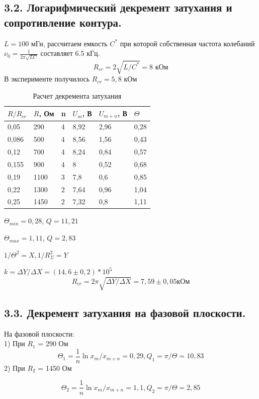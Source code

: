 \documentclass[a4paper,12pt]{article}
\begin{document}
\subsection*{3.2. Логарифмический декремент затухания и сопротивление контура.}

$L = 100$ мГн, рассчитаем емкость $C^*$ при которой собственная частота колебаний\\ $\nu_0 = \frac{1}{2\pi\sqrt{LC}}$ составляет 6.5 кГц.
$$
R_{cr} = 2\sqrt{L/C^*} = 8 \text{ кОм}
$$
В эксперименте получилось $R_{cr} = 5,8$ кОм
\newpage
\begin{table}[!ht]
    \centering
    \begin{tabular}{|l|l|l|l|l|l|}
    \hline
        $R/R_{cr}$ & $R$, Ом & n & $U_{m}$, В & $U_{m+n}$, В & $\Theta$ \\ \hline
        0,05 & 290 & 4 & 8,92 & 2,96 & 0,28 \\ \hline
        0,086 & 500 & 4 & 8,56 & 1,56 & 0,43 \\ \hline
        0,12 & 700 & 4 & 8,24 & 0,84 & 0,57 \\ \hline
        0,155 & 900 & 4 & 8 & 0,52 & 0,68 \\ \hline
        0,19 & 1100 & 3 & 7,8 & 0,6 & 0,85 \\ \hline
        0,22 & 1300 & 2 & 7,64 & 0,96 & 1,04 \\ \hline
        0,25 & 1450 & 2 & 7,32 & 0,8 & 1,11 \\ \hline
    \end{tabular}
\caption{Расчет декремента затухания}
\end{table}

$\Theta_{min} = 0,28$, $Q = 11,21$

$\Theta_{max} = 1,11$, $Q = 2,83$

$1/\Theta^2 = X, 1/R_\Sigma^2 = Y$



$k = \Delta Y/\Delta X = (14,6\pm 0,2)*10^5$
$$
R_{cr} = 2\pi\sqrt{\Delta Y/\Delta X} = 7,59\pm0,05 \text{кОм}
$$
\subsection*{3.3. Декремент затухания на фазовой плоскости.}
На фазовой плоскости:\\
1) При $R_1$ = 290 Ом 
$$
\Theta_1 = \frac{1}{n} \ln{x_m/x_{m+n}} = 0,29,
Q_1 =\pi/\Theta = 10,83
$$
2) При $R_2$ = 1450 Ом 

$$
\Theta_2 = \frac{1}{n} \ln{x_m/x_{m+n}} = 1,1,  
Q_2 = \pi/\Theta = 2,85
$$
\end{document}
